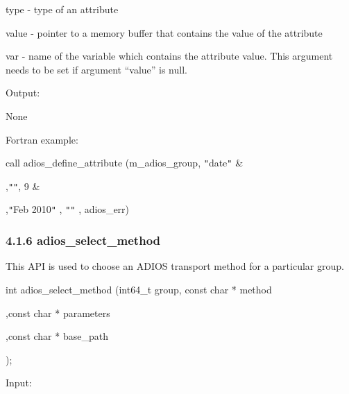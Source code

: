 \vspace{10pt}
type  - type of an attribute

\vspace{10pt}
value - pointer to a memory buffer that contains the value of the attribute

\vspace{10pt}
var - name of the variable which contains the attribute value. This argument needs 
to be set if argument ``value'' is null.  

\vspace{22pt}
\parindent=-22pt
Output:

\vspace{10pt}
\parindent=-4pt
None

\vspace{22pt}
\leftskip=22pt
\parindent=0pt
Fortran example: 

\vspace{10pt}
\leftskip=0pt
\parindent=46pt
call adios\_define\_attribute (m\_adios\_group, \texttt{"}date\texttt{"} \&

\vspace{10pt}
\parindent=234pt
,\texttt{"}\texttt{"}, 9 \&

\vspace{10pt}
,\texttt{"}Feb 2010\texttt{"} , \texttt{"}\texttt{"} , adios\_err)\label{HToc182553361}

\vspace{10pt}
\subsubsection*{{\large \textbf{4.1.6 adios\_select\_method}}}

\vspace{10pt}
\parindent=0pt
This API is used to choose an ADIOS transport method for a particular group. 

\vspace{10pt}
\leftskip=103pt
\parindent=-81pt
int adios\_select\_method (int64\_t group, const char * method

\vspace{10pt}
\parindent=91pt
,const char * parameters

\vspace{10pt}
,const char * base\_path

\vspace{10pt}
\parindent=264pt
);

\vspace{10pt}
\leftskip=22pt
\parindent=0pt
Input:

